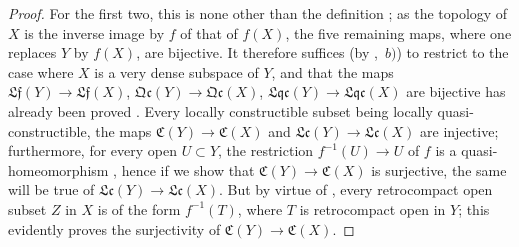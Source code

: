 \begin{proof}
For the first two, this is none other than the definition ; as the topology of $X$ is the inverse image by $f$ of that of $f(X)$, the five remaining maps, where one replaces $Y$ by $f(X)$, are bijective.
It therefore suffices (by ,~$b)$) to restrict to the case where $X$ is a very dense subspace of $Y$, and that the maps $\mathfrak{Lf}(Y)\to\mathfrak{Lf}(X)$, $\mathfrak{Qc}(Y)\to\mathfrak{Qc}(X)$, $\mathfrak{Lqc}(Y)\to\mathfrak{Lqc}(X)$ are bijective has already been proved .
Every locally constructible subset being locally quasi-constructible, the maps $\mathfrak{C}(Y)\to\mathfrak{C}(X)$ and $\mathfrak{Lc}(Y)\to\mathfrak{Lc}(X)$ are injective; furthermore, for every open $U\subset Y$, the restriction $f^{-1}(U)\to U$ of $f$ is a quasi-homeomorphism , hence if we show that $\mathfrak{C}(Y)\to\mathfrak{C}(X)$ is surjective, the same will be true of $\mathfrak{Lc}(Y)\to\mathfrak{Lc}(X)$.
But by virtue of , every retrocompact open subset $Z$ in $X$ is of the form $f^{-1}(T)$, where $T$ is retrocompact open in $Y$; this evidently proves the surjectivity of $\mathfrak{C}(Y)\to\mathfrak{C}(X)$.
\end{proof}

